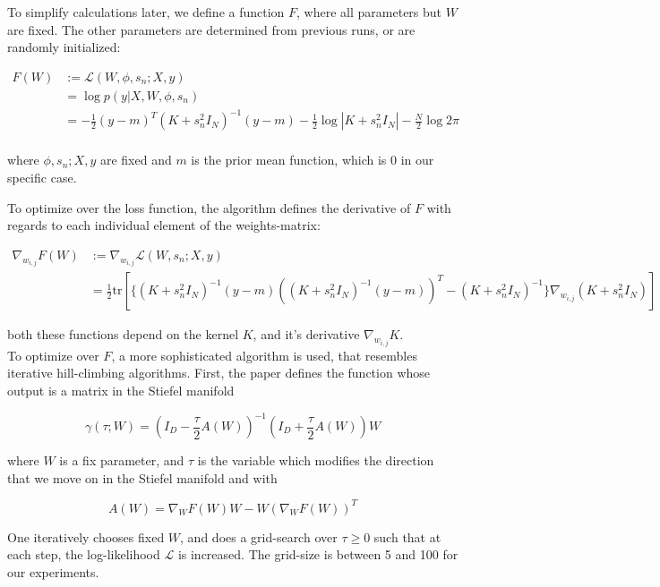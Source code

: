 To simplify calculations later, we define a function $F$, where all parameters but $W$ are fixed. 
The other parameters are determined from previous runs, or are randomly initialized:

\begin{align} \label{Eq:LogLikelihoodF}
F(W) &:= \mathcal{L}(W, \phi, s_n; X, y) \\
& = \log p(y | X, W, \phi, s_n) \\
& =  -\frac{1}{2} (y - m)^T (K + s_n^2 I_N)^{-1} (y - m) -\frac{1}{2} \log|K + s_n^2 I_N| -\frac{N}{2} \log 2 \pi   \\
\end{align}

where $\phi, s_n; X, y$ are fixed and $m$ is the prior mean function, which is 0 in our specific case.

To optimize over the loss function, the algorithm defines the derivative of $F$ with regards to each individual element of the weights-matrix:

\begin{align}
\nabla_{w_{i,j}} F(W) &:= \nabla_{w_{i,j}} \mathcal{L}(W, s_n; X, y) \\
& = \frac{1}{2} \text{tr} \left[ \{ (K + s_n^2 I_N)^{-1} (y-m) \left( (K + s_n^2 I_N)^{-1} (y-m) \right)^T - (K + s_n^2 I_N)^{-1} \} \nabla_{w_{i,j}} (K + s_n^2 I_N) \right]
\end{align}

both these functions depend on the kernel $K$, and it's derivative $\nabla_{w_{i,j}} K$. \\

To optimize over $F$, a more sophisticated algorithm is used, that resembles iterative hill-climbing algorithms.
First, the paper defines the function whose output is a matrix in the Stiefel manifold

\begin{equation}\label{Eq:TauFunction}
\gamma(\tau; W) = (I_D - \frac{\tau}{2} A(W) )^{-1} (I_D + \frac{\tau}{2} A(W) ) W
\end{equation}


where $W$ is a fix parameter, and $\tau$ is the variable which modifies the direction that we move on in the Stiefel manifold and with

\begin{equation}
A(W) = \nabla_{W} F(W) W - W ( \nabla_{W} F(W) )^T
\end{equation}

One iteratively chooses fixed $W$, and does a grid-search over $\tau \geq 0$ such that at each step, the log-likelihood $\mathcal{L}$ is increased.
The grid-size is between 5 and 100 for our experiments.

